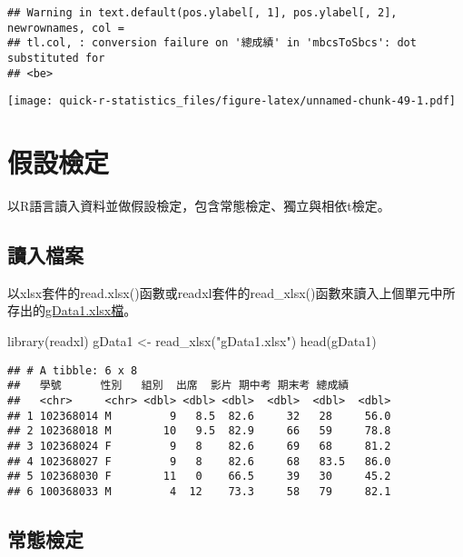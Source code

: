 \documentclass[
]{book}
\newenvironment{Shaded}{\begin{snugshade}}{\end{snugshade}}
\newcommand{\FunctionTok}[1]{\textcolor[rgb]{0.00,0.00,0.00}{#1}}
\newcommand{\NormalTok}[1]{#1}
\newcommand{\OtherTok}[1]{\textcolor[rgb]{0.56,0.35,0.01}{#1}}
\newcommand{\StringTok}[1]{\textcolor[rgb]{0.31,0.60,0.02}{#1}}
\begin{document}
\begin{verbatim}
## Warning in text.default(pos.ylabel[, 1], pos.ylabel[, 2], newrownames, col =
## tl.col, : conversion failure on '總成績' in 'mbcsToSbcs': dot substituted for
## <be>
\end{verbatim}

\texttt{[image: quick-r-statistics\_files/figure-latex/unnamed-chunk-49-1.pdf]}

\hypertarget{hypotesting}{%
\chapter{假設檢定}\label{hypotesting}}

以R語言讀入資料並做假設檢定，包含常態檢定、獨立與相依t檢定。

\hypertarget{ux8b80ux5165ux6a94ux6848-2}{%
\section{讀入檔案}\label{ux8b80ux5165ux6a94ux6848-2}}

以xlsx套件的read.xlsx()函數或readxl套件的read\_xlsx()函數來讀入上個單元中所存出的\href{https://docs.google.com/spreadsheets/d/1qx6T0brgzuigBpS0p-Wq8hVSFFku9ebV/edit\#gid=390389518}{gData1.xlsx檔}。

\begin{Shaded}
\begin{Highlighting}[]
\FunctionTok{library}\NormalTok{(readxl)}
\NormalTok{gData1 }\OtherTok{\textless{}{-}} \FunctionTok{read\_xlsx}\NormalTok{(}\StringTok{"gData1.xlsx"}\NormalTok{)}
\FunctionTok{head}\NormalTok{(gData1)}
\end{Highlighting}
\end{Shaded}

\begin{verbatim}
## # A tibble: 6 x 8
##   學號      性別   組別  出席  影片 期中考 期末考 總成績
##   <chr>     <chr> <dbl> <dbl> <dbl>  <dbl>  <dbl>  <dbl>
## 1 102368014 M         9   8.5  82.6     32   28     56.0
## 2 102368018 M        10   9.5  82.9     66   59     78.8
## 3 102368024 F         9   8    82.6     69   68     81.2
## 4 102368027 F         9   8    82.6     68   83.5   86.0
## 5 102368030 F        11   0    66.5     39   30     45.2
## 6 100368033 M         4  12    73.3     58   79     82.1
\end{verbatim}

\hypertarget{ux5e38ux614bux6aa2ux5b9a}{%
\section{常態檢定}\label{ux5e38ux614bux6aa2ux5b9a}}
\end{document}
